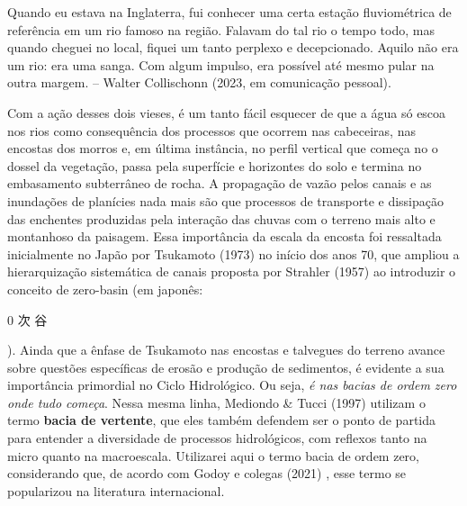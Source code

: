 \documentclass[./main.tex]{subfiles}
\begin{document}
\begin{adjustwidth}{100pt}{0pt}
\medskip
\small Quando eu estava na Inglaterra, fui conhecer uma certa estação fluviométrica de referência em um rio famoso na região. Falavam do tal rio o tempo todo, mas quando cheguei no local, fiquei um tanto perplexo e decepcionado. Aquilo não era um rio: era uma sanga. Com algum impulso, era possível até mesmo pular na outra margem. -- Walter Collischonn (2023, em comunicação pessoal).
\medskip
\end{adjustwidth}

\noindent Com a ação desses dois vieses, é um tanto fácil esquecer de que a água só escoa nos rios como consequência dos processos que ocorrem nas cabeceiras, nas encostas dos morros e, em última instância, no perfil vertical que começa no o dossel da vegetação, passa pela superfície e horizontes do solo e termina no embasamento subterrâneo de rocha. A propagação de vazão pelos canais e as inundações de planícies nada mais são que processos de transporte e dissipação das enchentes produzidas pela interação das chuvas com o terreno mais alto e montanhoso da paisagem. Essa importância da escala da encosta foi ressaltada inicialmente no Japão por Tsukamoto (1973) \cite{tsukamoto1973} no início dos anos 70, que ampliou a hierarquização sistemática de canais proposta por Strahler (1957) \cite{strahler1957} ao introduzir o conceito de \gls{zero-basin} (em japonês: \begin{CJK}{UTF8}{min}0 次 谷\end{CJK}). Ainda que a ênfase de Tsukamoto nas encostas e talvegues do terreno avance sobre questões específicas de erosão e produção de sedimentos, é evidente a sua importância primordial no Ciclo Hidrológico. Ou seja, \textit{é nas bacias de ordem zero onde tudo começa}. Nessa mesma linha, Mediondo \& Tucci (1997) \cite{mediondo1997} utilizam o termo \textbf{bacia de vertente}, que eles também defendem ser o ponto de partida para entender a diversidade de processos hidrológicos, com reflexos tanto na micro quanto na macroescala. Utilizarei aqui o termo bacia de ordem zero, considerando que, de acordo com Godoy e colegas (2021) \cite{godoy2021}, esse termo se popularizou na literatura internacional.
\end{document}
